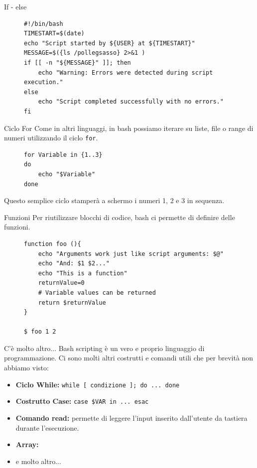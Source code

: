 \begin{frame}[fragile]{If - else}
  \begin{figure}
    \begin{lstlisting}[backgroundcolor=\color{expowhite!50!white}]
#!/bin/bash
TIMESTART=$(date)
echo "Script started by ${USER} at ${TIMESTART}"
MESSAGE=$({ls /pollegsasso} 2>&1 )
if [[ -n "${MESSAGE}" ]]; then
    echo "Warning: Errors were detected during script execution."
else
    echo "Script completed successfully with no errors."
fi
\end{lstlisting}
  \end{figure}
\end{frame}

\begin{frame}[fragile]{Ciclo For}
  Come in altri linguaggi, in bash possiamo iterare su liste, file o range di numeri utilizzando il ciclo \texttt{for}. \medskip

  \begin{figure}
    \begin{lstlisting}[backgroundcolor=\color{expowhite!50!white}]
for Variable in {1..3}
do
    echo "$Variable"
done
\end{lstlisting}
  \end{figure}\medskip

  Questo semplice ciclo stamperà a schermo i numeri 1, 2 e 3 in sequenza.
\end{frame}


\begin{frame}[fragile]{Funzioni}
  Per riutilizzare blocchi di codice, bash ci permette di definire delle funzioni.

  \begin{figure}
    \begin{lstlisting}[backgroundcolor=\color{expowhite!50!white}]
function foo (){
    echo "Arguments work just like script arguments: $@"
    echo "And: $1 $2..."
    echo "This is a function"
    returnValue=0
    # Variable values can be returned
    return $returnValue
}

$ foo 1 2
\end{lstlisting}
  \end{figure}
\end{frame}


\begin{frame}[fragile]{C'è molto altro...}
  Bash scripting è un vero e proprio linguaggio di programmazione. Ci sono molti altri costrutti e comandi utili che per brevità non abbiamo visto:
  \medskip
  
  \begin{itemize}
    \item \textbf{Ciclo While:} \texttt{while [ condizione ]; do ... done} 
    \item \textbf{Costrutto Case:} \texttt{case \$VAR in ... esac}
    \item \textbf{Comando read:} permette di leggere l'input inserito dall'utente da tastiera durante l'esecuzione.
    \item \textbf{Array:} 
    \item e molto altro...
  \end{itemize}
\end{frame}